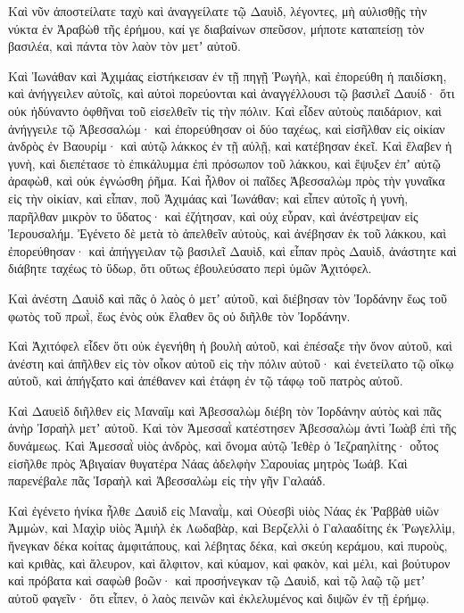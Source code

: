 {Καὶ νῦν ἀποστείλατε ταχὺ καὶ ἀναγγείλατε τῷ Δαυὶδ, λέγοντες, μὴ αὐλισθῇς τὴν νύκτα ἐν Ἀραβὼθ τῆς ἐρήμου, καί γε διαβαίνων σπεῦσον, μήποτε καταπείσῃ τὸν βασιλέα, καὶ πάντα τὸν λαὸν τὸν μετʼ αὐτοῦ.
\par }{\PP {}Καὶ Ἰωνάθαν καὶ Ἀχιμάας εἱστήκεισαν ἐν τῇ πηγῇ Ῥωγὴλ, καὶ ἐπορεύθη ἡ παιδίσκη, καὶ ἀνήγγειλεν αὐτοῖς, καὶ αὐτοὶ πορεύονται καὶ ἀναγγέλλουσι τῷ βασιλεῖ Δαυίδ· ὅτι οὐκ ἠδύναντο ὀφθῆναι τοῦ εἰσελθεῖν τἰς τὴν πόλιν.
Καὶ εἶδεν αὐτοὺς παιδάριον, καὶ ἀνήγγειλε τῷ Ἀβεσσαλώμ· καὶ ἐπορεύθησαν οἱ δύο ταχέως, καὶ εἰσῆλθαν εἰς οἰκίαν ἀνδρὸς ἐν Βαουρίμ· καὶ αὐτῷ λάκκος ἐν τῇ αὐλῇ, καὶ κατέβησαν ἐκεῖ.
Καὶ ἔλαβεν ἡ γυνὴ, καὶ διεπέτασε τὸ ἐπικάλυμμα ἐπὶ πρόσωπον τοῦ λάκκου, καὶ ἔψυξεν ἐπʼ αὐτῷ ἀραφὼθ, καὶ οὐκ ἐγνώσθη ῥῆμα.
Καὶ ἦλθον οἱ παῖδες Ἀβεσσαλὼμ πρὸς τὴν γυναῖκα εἰς τὴν οἰκίαν, καὶ εἶπαν, ποῦ Ἀχιμάας καὶ Ἰωνάθαν; καὶ εἶπεν αὐτοῖς ἡ γυνὴ, παρῆλθαν μικρὸν το ὕδατος· καὶ ἐζήτησαν, καὶ οὐχ εὗραν, καὶ ἀνέστρεψαν εἰς Ἰερουσαλήμ.
Ἐγένετο δὲ μετὰ τὸ ἀπελθεῖν αὐτοὺς, καὶ ἀνέβησαν ἐκ τοῦ λάκκου, καὶ ἐπορεύθησαν· καὶ ἀπήγγειλαν τῷ βασιλεῖ Δαυὶδ, καὶ εἶπαν πρὸς Δαυὶδ, ἀνάστητε καὶ διάβητε ταχέως τὸ ὕδωρ, ὅτι οὕτως ἐβουλεύσατο περὶ ὑμῶν Ἀχιτόφελ.
\par }{\PP {}Καὶ ἀνέστη Δαυὶδ καὶ πᾶς ὁ λαὸς ὁ μετʼ αὐτοῦ, καὶ διέβησαν τὸν Ἰορδάνην ἕως τοῦ φωτὸς τοῦ πρωῒ, ἕως ἑνὸς οὐκ ἔλαθεν ὃς οὐ διῆλθε τὸν Ἰορδάνην.
\par }{\PP {}Καὶ Ἀχιτόφελ εἶδεν ὅτι οὐκ ἐγενήθη ἡ βουλὴ αὐτοῦ, καὶ ἐπέσαξε τὴν ὄνον αὐτοῦ, καὶ ἀνέστη καὶ ἀπῆλθεν εἰς τὸν οἶκον αὐτοῦ εἰς τὴν πόλιν αὐτοῦ· καὶ ἐνετείλατο τῷ οἴκῳ αὐτοῦ, καὶ ἀπήγξατο καὶ ἀπέθανεν καὶ ἐτάφη ἐν τῷ τάφῳ τοῦ πατρὸς αὐτοῦ.
\par }{\PP {}Καὶ Δαυεὶδ διῆλθεν εἰς Μαναΐμ καὶ Ἀβεσσαλὼμ διέβη τὸν Ἰορδάνην αὐτὸς καὶ πᾶς ἀνὴρ Ἰσραὴλ μετʼ αὐτοῦ.
Καὶ τὸν Ἀμεσσαῒ κατέστησεν Ἀβεσσαλὼμ ἀντὶ Ἰωὰβ ἐπὶ τῆς δυνάμεως. Καὶ Ἀμεσσαῒ υἱὸς ἀνδρὸς, καὶ ὄνομα αὐτῷ Ἰεθὲρ ὁ Ἰεζραηλίτης· οὗτος εἰσῆλθε πρὸς Ἀβιγαίαν θυγατέρα Νάας ἀδελφὴν Σαρουίας μητρὸς Ἰωάβ.
Καὶ παρενέβαλε πᾶς Ἰσραὴλ καὶ Ἀβεσσαλὼμ εἰς τὴν γῆν Γαλαάδ.
\par }{\PP {}Καὶ ἐγένετο ἡνίκα ἦλθε Δαυὶδ εἰς Μαναῒμ, καὶ Οὐεσβὶ υἱὸς Νάας ἐκ Ῥαββὰθ υἱῶν Ἀμμὼν, καὶ Μαχὶρ υἱὸς Ἀμιὴλ ἐκ Λωδαβὰρ, καὶ Βερζελλὶ ὁ Γαλααδίτης ἐκ Ῥωγελλὶμ,
ἤνεγκαν δέκα κοίτας ἀμφιτάπους, καὶ λέβητας δέκα, καὶ σκεύη κεράμου, καὶ πυροὺς, καὶ κριθὰς, καὶ ἄλευρον, καὶ ἄλφιτον, καὶ κύαμον, καὶ φακὸν,
καὶ μέλι, καὶ βούτυρον καὶ πρόβατα καὶ σαφὼθ βοῶν· καὶ προσήνεγκαν τῷ Δαυὶδ, καὶ τῷ λαῷ τῷ μετʼ αὐτοῦ φαγεῖν· ὅτι εἶπεν, ὁ λαὸς πεινῶν καὶ ἐκλελυμένος καὶ διψῶν ἐν τῇ ἐρήμῳ.

}
